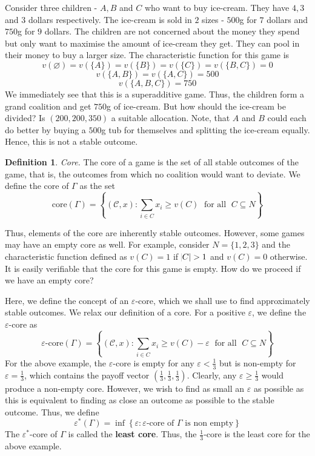 \documentclass{article}
\theoremstyle{definition}
\newtheorem{defn}[theorem]{Definition}
\begin{document}
Consider three children - $A,B$ and $C$ who want to buy ice-cream. They have $4,3$ and $3$ dollars respectively. The ice-cream is sold in $2$ sizes - $500$g for $7$ dollars and $750$g for $9$ dollars. The children are not concerned about the money they spend but only want to maximise the amount of ice-cream they get. They can pool in their money to buy a larger size. The characteristic function for this game is 
\[
    v(\varnothing) = v\left(\{A\}\right) = v\left(\{B\}\right) = v\left(\{C\}\right) = v\left( \{ B,C \} \right) = 0
\]
\[
    v\left( \{ A,B \} \right) =   v\left( \{ A,C \} \right) = 500
\]
\[
     v\left( \{ A,B,C \} \right) = 750
\]
We immediately see that this is a superadditive game. Thus, the children form a grand coalition and get $750$g of ice-cream. But how should the ice-cream be divided? Is $(200,200,350)$ a suitable allocation. Note, that $A$ and $B$ could each do better by buying a $500$g tub for themselves and splitting the ice-cream equally. Hence, this is not a stable outcome. \medskip

\begin{defn}
\textit{Core.} The core of a game is the set of all stable outcomes of the game, that is, the outcomes from which no coalition would want to deviate. We define the core of $\Gamma$ as the set 
\[
    \text{core}(\Gamma) = \left\{ (\mathcal{C}, x) \colon \sum\limits_{i \in C} x_i \geq v(C) \; \text{ for all } \; C \subseteq N \right\}
\]
\end{defn}

Thus, elements of the core are inherently stable outcomes. However, some games may have an empty core as well. For example, consider $N = \{1,2,3\}$ and the characteristic function defined as $v(C) = 1$ if $\abs{C} > 1$ and $v(C)=0$ otherwise. It is easily verifiable that the core for this game is empty. How do we proceed if we have an empty core? \medskip

Here, we define the concept of an $\varepsilon$-core, which we shall use to find approximately stable outcomes. We relax our definition of a core. For a positive $\varepsilon$, we define the $\varepsilon$-core as 
\[
    \varepsilon\text{-core}(\Gamma) = \left\{ (\mathcal{C}, x) \colon \sum\limits_{i \in C} x_i \geq v(C) - \varepsilon \; \text{ for all } \; C \subseteq N \right\}
\]
For the above example, the $\varepsilon$-core is empty for any $\varepsilon < \frac{1}{3}$ but is non-empty for $\varepsilon = \frac{1}{3}$, which contains the payoff vector $\left(\frac{1}{3}, \frac{1}{3}, \frac{1}{3} \right)$. Clearly, any $ \varepsilon \geq \frac{1}{3}$ would produce a non-empty core. However, we wish to find as small an $\varepsilon$ as possible as this is equivalent to finding as close an outcome as possible to the stable outcome. Thus, we define 
\[
    \varepsilon^* \left( \Gamma \right) = \inf \left\{ \varepsilon \colon \varepsilon\text{-core of } \Gamma \text{ is non empty} \right\}
\]
The $\varepsilon^*$-core of $\Gamma$ is called the \textbf{least core}. Thus, the $\frac{1}{3}$-core is the least core for the above example.
\end{document}
